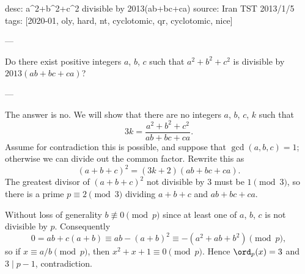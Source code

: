 desc: a^2+b^2+c^2 divisible by 2013(ab+bc+ca)
source: Iran TST 2013/1/5
tags: [2020-01, oly, hard, nt, cyclotomic, qr, cyclotomic, nice]

---

Do there exist positive integers $a$, $b$, $c$ such that $a^2+b^2+c^2$ is divisible by $2013(ab+bc+ca)$?

---

The answer is no. We will show that there are no integers $a$, $b$, $c$, $k$ such that \[3k=\frac{a^2+b^2+c^2}{ab+bc+ca}.\]
Assume for contradiction this is possible, and suppose that $\gcd(a,b,c)=1$; otherwise we can divide out the common factor. Rewrite this as \[(a+b+c)^2=(3k+2)(ab+bc+ca).\]
The greatest divisor of $(a+b+c)^2$ not divisible by $3$ must be $1\pmod3$, so there is a prime $p\equiv2\pmod3$ dividing $a+b+c$ and $ab+bc+ca$.

Without loss of generality $b\not\equiv0\pmod p$ since at least one of $a$, $b$, $c$ is not divisible by $p$. Consequently \[0=ab+c(a+b)\equiv ab-(a+b)^2\equiv-\left(a^2+ab+b^2\right)\pmod p,\]
so if $x\equiv a/b\pmod p$, then $x^2+x+1\equiv0\pmod p$. Hence $\ord_p(x)=3$ and $3\mid p-1$, contradiction.
